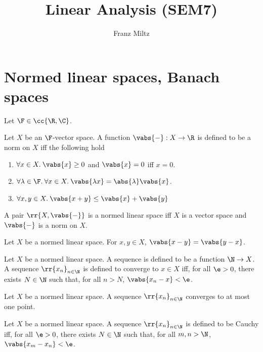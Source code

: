 \documentclass{article}
\begin{document}
\mkthmstwounified
\title{Linear Analysis (SEM7)}
\author{Franz Miltz}
\maketitle
\tableofcontents
\pagebreak

\section{Normed linear spaces, Banach spaces}
\label{sec:definitions}

Let $\F\in \cc{ \R,\C }$.

\begin{definition}
  \label{def:nls}
  Let $X$ be an $\F$-vector space.
  A function $ \vabs{ - } : X \to \R$ is defined to be a norm on $X$ iff the following hold
  \begin{enumerate}
    \item $\forall x\in X.\: \vabs{ x }\geq 0$ and $ \vabs{ x } = 0$ iff $x = 0$.
    \item $\forall \lambda\in\F.\:\forall x \in X.\: \vabs{ \lambda x } = \abs{ \lambda } \vabs{ x }$.
    \item $\forall x,y\in X.\: \vabs{ x + y } \leq \vabs{ x } + \vabs{ y }$
  \end{enumerate}
  A pair $ \rr{ X, \vabs{ - } }$ is a normed linear space iff $X$ is a vector space and $ \vabs{ - } $
  is a norm on $X$.
\end{definition}


\begin{theorem}
  \label{thm:symmetry}
  Let $X$ be a normed linear space. For $x,y\in X$, $ \vabs{ x - y } = \vabs{ y - x } $.
\end{theorem}


\begin{definition}
  \label{def:convergence}
  Let $X$ be a normed linear space. A sequence is defined to be a function $\N\to X$. A
  sequence $ \rr{x_n}_{n\in\N}$ is defined to converge to $x\in X$ iff, for all $\e > 0$,
  there exists $N\in\N$ such that, for all $n>N$, $ \vabs{ x_n - x } < \e$.
\end{definition}


\begin{theorem}
  \label{thm:uniquenes-of-the-limit}
  Let $X$ be a normed linear space. A sequence $ \rr{x_n}_{n\in\N}$ converges to at most one point.
\end{theorem}


\begin{definition}
  \label{def:cauchy}
  Let $X$ be a normed linear space. A sequence $ \rr{x_n}_{n\in\N}$ is defined to be Cauchy iff,
  for all $\e>0$, there exists $N\in\N$ such that, for all $m,n>\N$, $ \vabs{ x_m - x_n } < \e$.
\end{definition}
\end{document}

